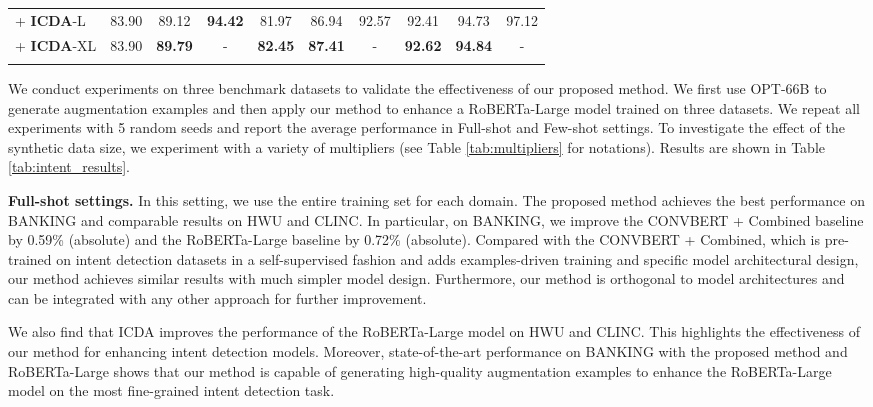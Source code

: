 \documentclass[11pt]{article}
\begin{document}
\begin{table*}[t!]
\begin{tabular}{lccccccccc}
                        \quad + \textbf{ICDA}-L & 83.90 & 89.12 & \textbf{94.42} & 81.97 &  86.94 & 92.57 & 92.41 & 94.73 & 97.12 \\
                        \quad + \textbf{ICDA}-XL & 83.90 & \textbf{89.79} & - & \textbf{82.45} & \textbf{87.41} & - & \textbf{92.62} & \textbf{94.84} & -\\
\Xhline{2\arrayrulewidth}
\end{tabular}
\caption{Intent Detection Accuracy (in \%) in few-/full-shot settings with augmented data from OPT-66B. Numbers in bold are the best results and numbers with  are statistically significant by t-test  () compared to the baselines (\textbf{5} / \textbf{10} examples per intent).}
\label{tab:intent_results}
\end{table*}

We conduct experiments on three benchmark datasets to validate the effectiveness of our proposed method. 
We first use OPT-66B to generate augmentation examples and then apply our method to enhance a RoBERTa-Large model trained on three datasets. 
We repeat all experiments with 5 random seeds and report the average performance in Full-shot and Few-shot settings. To investigate the effect of the synthetic data size, we experiment with a variety of multipliers (see Table \ref{tab:multipliers} for notations).
Results are shown in Table \ref{tab:intent_results}.

\textbf{Full-shot settings.}
In this setting, we use the entire training set for each domain.
The proposed method  achieves the best performance on BANKING and comparable results on HWU and CLINC.
In particular, on BANKING, we improve the C{\small ONV}BERT + Combined baseline \cite{mehri-eric-2021-example} by 0.59\% (absolute) and the RoBERTa-Large baseline by 0.72\% (absolute).
Compared with the C{\small ONV}BERT + Combined, which is pre-trained on intent detection datasets in a self-supervised fashion and adds examples-driven training and specific model architectural design, our method achieves similar results with much simpler model design. 
Furthermore, our method is orthogonal to model architectures and can be integrated with any other approach for further improvement.

We also find that ICDA improves the performance of the RoBERTa-Large model on HWU and CLINC.
This highlights the effectiveness of our method for enhancing intent detection models.
Moreover, state-of-the-art performance on BANKING with the proposed method and RoBERTa-Large shows that our method is capable of generating high-quality augmentation examples to enhance the RoBERTa-Large model on the most fine-grained intent detection task. 
\end{document}
